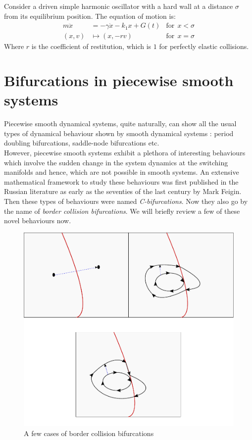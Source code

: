 \documentclass{book}
\renewcommand{\(}{\begin{columns}}
\renewcommand{\)}{\end{columns}}
\newcommand{\<}[1]{\begin{column}{#1}}
\renewcommand{\>}{\end{column}}
\begin{document}
Consider a driven simple harmonic oscillator with a hard wall at a distance 
$\sigma$ from its equilibrium position.   The equation of motion is:
\begin{align}
\label{eq-soft_impact}
m\ddot{x}&=-\gamma \dot{x}-k_1x+G(t)&\mathrm{for}~~x<\sigma\\
(x,v)&\mapsto (x,-rv)&\mathrm{for}~~x=\sigma
\end{align}
Where $r$ is the coefficient of restitution, which is $1$ for perfectly 
elastic collisions.  


\section{Bifurcations in piecewise smooth systems}
Piecewise smooth dynamical systems, quite naturally, can show all the usual 
types of dynamical behaviour shown by smooth dynamical systems : period 
doubling\cite[p.~166-170]{hilborn-chaos} bifurcations, 
saddle-node\cite[p.~109]{hilborn-chaos} bifurcations etc.  \\

However,  piecewise smooth systems exhibit a plethora of interesting behaviours
which involve the sudden change in the system dynamics at the switching 
manifolds and hence, which are not possible in smooth systems. An extensive mathematical 
framework to study these behaviours was first published in the Russian 
literature as early as the seventies of the last century by Mark Feigin\cite{feigin-1970}.
Then these types of behaviours were named \emph{C-bifurcations}.  Now they also go by 
the name of \emph{border collision bifurcations}. We will briefly review a few 
of these novel  behaviours now.   

\begin{figure}[!htp]
\caption{A few cases of border collision bifurcations}
\begin{center}
\includegraphics[width=0.9\columnwidth]{c-bifs}
\end{center}
\end{figure}
\end{document}
